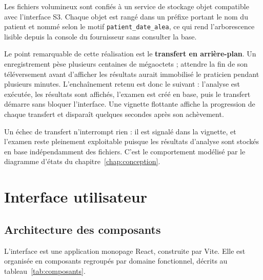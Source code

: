 Les fichiers volumineux sont confiés à un service de stockage objet compatible avec
l'interface S3. Chaque objet est rangé dans un préfixe portant le nom du patient et
nommé selon le motif \texttt{patient\_date\_alea}, ce qui rend l'arborescence lisible
depuis la console du fournisseur sans consulter la base.

Le point remarquable de cette réalisation est le \textbf{transfert en arrière-plan}.
Un enregistrement pèse plusieurs centaines de mégaoctets ; attendre la fin de son
téléversement avant d'afficher les résultats aurait immobilisé le praticien pendant
plusieurs minutes. L'enchaînement retenu est donc le suivant : l'analyse est exécutée,
les résultats sont affichés, l'examen est créé en base, puis le transfert démarre sans
bloquer l'interface. Une vignette flottante affiche la progression de chaque transfert
et disparaît quelques secondes après son achèvement.

Un échec de transfert n'interrompt rien : il est signalé dans la vignette, et l'examen
reste pleinement exploitable puisque les résultats d'analyse sont stockés en base
indépendamment des fichiers. C'est le comportement modélisé par le diagramme d'états du
chapitre~\ref{chap:conception}.

\section{Interface utilisateur}

\subsection{Architecture des composants}

L'interface est une application monopage React, construite par Vite. Elle est
organisée en composants regroupés par domaine fonctionnel, décrits au
tableau~\ref{tab:composants}.

